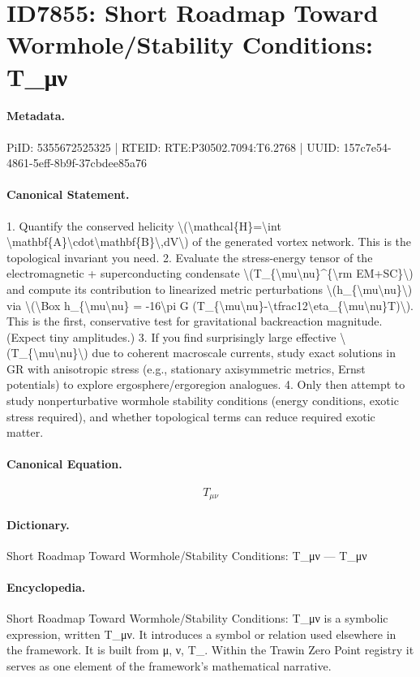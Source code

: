 \section*{ID7855: Short Roadmap Toward Wormhole/Stability Conditions: T\_μν}
\paragraph{Metadata.}
PiID: 5355672525325 | RTEID: RTE:P30502.7094:T6.2768 | UUID: 157c7e54-4861-5eff-8b9f-37cbdee85a76

\paragraph{Canonical Statement.}
1. Quantify the conserved helicity \textbackslash{}(\textbackslash{}mathcal\{H\}=\textbackslash{}int \textbackslash{}mathbf\{A\}\textbackslash{}cdot\textbackslash{}mathbf\{B\}\textbackslash{},dV\textbackslash{}) of the generated vortex network. This is the topological invariant you need. 2. Evaluate the stress-energy tensor of the electromagnetic + superconducting condensate \textbackslash{}(T\_\{\textbackslash{}mu\textbackslash{}nu\}\textasciicircum{}\{\textbackslash{}rm EM+SC\}\textbackslash{}) and compute its contribution to linearized metric perturbations \textbackslash{}(h\_\{\textbackslash{}mu\textbackslash{}nu\}\textbackslash{}) via \textbackslash{}(\textbackslash{}Box h\_\{\textbackslash{}mu\textbackslash{}nu\} = -16\textbackslash{}pi G (T\_\{\textbackslash{}mu\textbackslash{}nu\}-\textbackslash{}tfrac12\textbackslash{}eta\_\{\textbackslash{}mu\textbackslash{}nu\}T)\textbackslash{}). This is the first, conservative test for gravitational backreaction magnitude. (Expect tiny amplitudes.) 3. If you find surprisingly large effective \textbackslash{}(T\_\{\textbackslash{}mu\textbackslash{}nu\}\textbackslash{}) due to coherent macroscale currents, study exact solutions in GR with anisotropic stress (e.g., stationary axisymmetric metrics, Ernst potentials) to explore ergosphere/ergoregion analogues. 4. Only then attempt to study nonperturbative wormhole stability conditions (energy conditions, exotic stress required), and whether topological terms can reduce required exotic matter.

\paragraph{Canonical Equation.}
\[
T_{\mu\nu}
\]

\paragraph{Dictionary.}
Short Roadmap Toward Wormhole/Stability Conditions: T\_μν — T\_μν

\paragraph{Encyclopedia.}
Short Roadmap Toward Wormhole/Stability Conditions: T\_μν is a symbolic expression, written T\_μν. It introduces a symbol or relation used elsewhere in the framework. It is built from μ, ν, T\_. Within the Trawin Zero Point registry it serves as one element of the framework's mathematical narrative.
